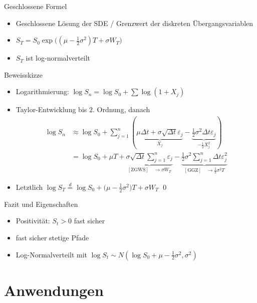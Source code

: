\documentclass{beamer}
\begin{document}
\begin{frame}{Geschlossene Formel}
  \begin{itemize}
      \item Geschlossene Lösung der SDE / Grenzwert der diskreten Übergangsvariablen
      \item $S_T = S_0 \exp\big((\mu-\tfrac12\sigma^2)T + \sigma W_T\big)$
      \item $S_T$ ist log-normalverteilt
  \end{itemize}
\end{frame}

\begin{frame}{Beweisskizze}
  \begin{itemize}
      \item Logarithmierung: $\log S_n = \log S_0 + \sum \log(1+X_j)$
      \item Taylor-Entwicklung bis 2. Ordnung, danach $$
\begin{aligned}
\log S_n &\approx \log S_0 + \sum_{j=1}^n\left( \underbrace{\mu \Delta t + \sigma\sqrt{\Delta t} \varepsilon_j}_{X_j} - \underbrace{\frac{1}{2} \sigma^2 \Delta t \varepsilon_j}_{-\frac{1}{2} X_j^2} \right)
\\ &= \log S_0 + \mu T +  \underbrace{\sigma\sqrt{\Delta t} \sum_{j=1}^{n} \varepsilon_j}_{\mathrm{[ZGWS]} \quad \to \sigma W_T} - \underbrace{\frac{1}{2} \sigma^2 \sum_{j=1}^{n} \Delta t \varepsilon_j^2}_{\mathrm{[GGZ]} \quad \to \frac12 \sigma^2 T}
\end{aligned}
$$
      \item Letztlich $\log S_T \overset{d} = \log S_0 + \big(\mu - \tfrac12 \sigma^2\big)T + \sigma W_T$ \qed
  \end{itemize}
\end{frame}

\begin{frame}{Fazit und Eigenschaften}
  \begin{itemize}
      \item Positivität: $S_t>0$ fast sicher
      \item fast sicher stetige Pfade
      \item Log-Normalverteilt mit $\log S_t \sim N(\log S_0 + \mu - \tfrac12 \sigma^2, \sigma^2)$
  \end{itemize}
\end{frame}

\section{Anwendungen}
\end{document}
